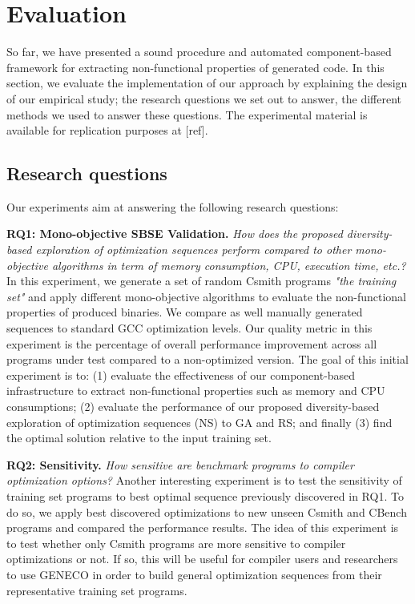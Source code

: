 \section{Evaluation}
So far, we have presented a sound procedure and automated component-based framework for extracting non-functional properties of generated code. In this section, we evaluate the implementation of our approach by explaining the design of our empirical study; the research questions we set out to answer, the different methods we used to answer these questions. The experimental material is
available for replication purposes at [ref].

\subsection{Research questions}
Our experiments aim at answering the following research questions:

\textbf{RQ1: Mono-objective SBSE Validation.} 
\textit{How does the proposed diversity-based exploration of optimization sequences perform compared to other mono-objective algorithms in term of memory consumption, CPU, execution time, etc.?} 
In this experiment, we generate a set of random Csmith programs \textit{"the training set"} and apply different mono-objective algorithms to evaluate the non-functional properties of produced binaries. We compare as well manually generated sequences to standard GCC optimization levels. Our quality metric in this experiment is the percentage of overall performance improvement across all programs under test compared to a non-optimized version. The goal of this initial experiment is to: (1) evaluate the effectiveness of our component-based infrastructure to extract non-functional properties such as memory and CPU consumptions; (2) evaluate the performance of our proposed diversity-based exploration of optimization sequences (NS) to GA and RS; and finally (3) find the optimal solution relative to the input training set. 

\textbf{RQ2: Sensitivity.} 
\textit{How sensitive are benchmark programs to compiler optimization options?}
Another interesting experiment is to test the sensitivity of training set programs to best optimal sequence previously discovered in RQ1. To do so, we apply best discovered optimizations to new unseen Csmith and CBench programs and compared the performance results. The idea of this experiment is to test whether only Csmith programs are more sensitive to compiler optimizations or not. If so, this will be useful for compiler users and researchers to use GENECO in order to build general optimization sequences from their representative training set programs.



